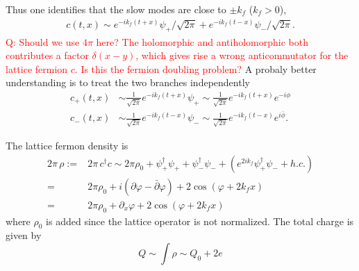 Thus one identifies that the slow modes are close to $\pm k_f$ ($k_f > 0$),
\begin{equation}
	\begin{aligned}
		c\left(t,x\right) \sim e^{-ik_f \left( t+x \right)} \psi_{+}/\sqrt{2\pi} + e^{-ik_f\left(t-x\right)} \psi_{-}/\sqrt{2\pi}.
	\end{aligned}
\end{equation} 
\textcolor{red}{Q: Should we use $4\pi$ here? The holomorphic and antiholomorphic both contributes a factor $\delta(x-y)$, which gives rise a wrong anticommutator for the lattice fermion $c$. Is this the fermion doubling problem?} A probaly better understanding is to treat the two branches independently
\begin{equation}
	\begin{aligned}
		c_{+}\left(t,x\right) &\sim \frac{1}{\sqrt{2\pi}}e^{-ik_f \left( t+x \right)} \psi_{+} \sim \frac{1}{\sqrt{2\pi}}e^{-ik_f \left( t+x \right)} e^{-i\phi} \\
		c_{-}\left(t,x\right) &\sim \frac{1}{\sqrt{2\pi}}e^{-ik_f\left(t-x\right)} \psi_{-} \sim \frac{1}{\sqrt{2\pi}}e^{-ik_f\left(t-x\right)} e^{i\bar{\phi}}.
	\end{aligned}
\end{equation}


The lattice fermon density is 
\begin{equation}
	\begin{aligned}
		2\pi\,\rho :=& 2\pi\,c^\dagger c \sim 2\pi \rho_0 + \psi_{+}^\dagger \psi_{+} + \psi_{-}^\dagger \psi_{-} + \left(e^{2i k_f}\psi_{+}^\dagger \psi_{-} + h.c. \right) \\
		=&  2\pi \rho_0 +  i \left(\partial \varphi - \bar{\partial} \varphi\right) + 2 \cos (\varphi + 2k_f x) \\
		=& 2\pi \rho_0 +  \partial_x \varphi + 2 \cos (\varphi + 2k_f x)
	\end{aligned}
\end{equation}
where $\rho_0$ is added since the lattice operator is not normalized. The total charge is given by 
\begin{equation}
	Q \sim \int \rho \sim Q_0 + 2e
\end{equation}
\\

